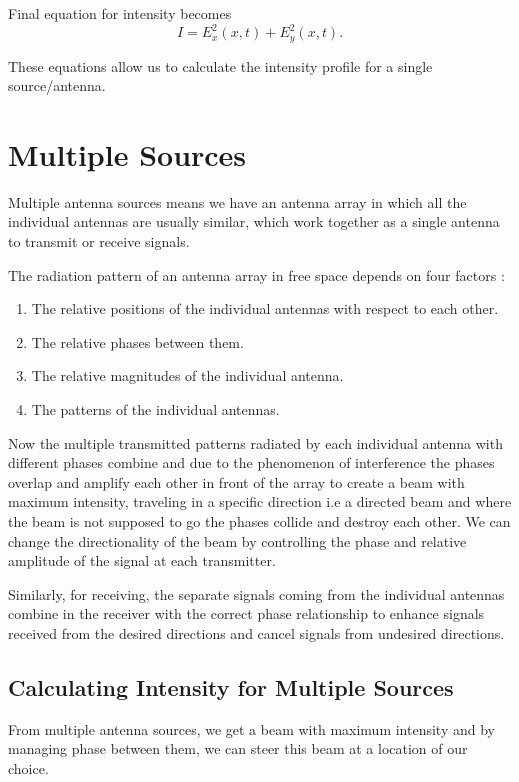 Final equation for intensity becomes
%
\begin{equation}\label{eqn:final_intensity}
   I = E_x^2(x,t)+E_y^2(x,t).
\end{equation}

These equations allow us to calculate the intensity profile for a single source/antenna.


\section{Multiple Sources}

Multiple antenna sources means we have an antenna array in which all the individual antennas are usually similar, which work together as a single antenna to transmit or receive signals.

The radiation pattern of an antenna array in free space depends on four factors \cite{mailloux2005phased}:
%
\begin{enumerate}
	\item The relative positions of the individual antennas with respect to each other.
	\item The relative phases between them.
	\item The relative magnitudes of the individual antenna.
	\item The patterns of the individual antennas.
\end{enumerate}

	
Now the multiple transmitted patterns radiated by each individual antenna with different phases combine and due to the phenomenon of interference the phases overlap and amplify each other in front of the array to create a beam with maximum intensity, traveling in a specific direction i.e a directed beam and where the beam is not supposed to go the phases collide and destroy each other. We can change the directionality of the beam by controlling the phase and relative amplitude of the signal at each transmitter.

Similarly, for receiving, the separate signals coming from the individual antennas combine in the receiver with the correct phase relationship to enhance signals received from the desired directions and cancel signals from undesired directions.

\subsection{Calculating Intensity for Multiple Sources}

From multiple antenna sources, we get a beam with maximum intensity and by managing phase between them, we can steer this beam at a location of our choice.


